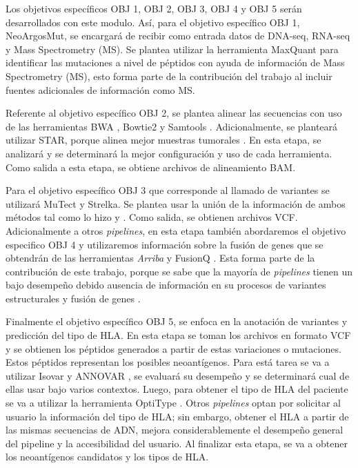 \documentclass[a4paper,11pt]{article}
\begin{document}
Los objetivos específicos OBJ 1, OBJ  2, OBJ 3, OBJ 4 y OBJ 5 serán desarrollados con este modulo. Así, para el objetivo específico OBJ 1, NeoArgosMut, se encargará de recibir como entrada datos de DNA-seq, RNA-seq y Mass Spectrometry (MS). Se plantea utilizar la herramienta MaxQuant \cite{prianichnikov2020maxquant} para identificar las mutaciones a nivel de péptidos con ayuda de información de Mass Spectrometry (MS), esto  forma parte de la contribución del trabajo al incluir fuentes adicionales de información como MS.


Referente al objetivo específico OBJ 2, se plantea alinear las secuencias con uso de las herramientas BWA \cite{li2009fast}, Bowtie2 \cite{langmead2019scaling} y Samtools \cite{danecek2021twelve}. Adicionalmente, se planteará utilizar STAR, porque alinea mejor muestras tumorales \cite{rubinsteyn2018computational}. En esta etapa, se analizará y se determinará la mejor configuración y uso de cada herramienta. Como salida a esta etapa, se obtiene archivos de alineamiento BAM.



Para el objetivo específico OBJ 3 que corresponde al llamado de variantes se utilizará MuTect y Strelka. Se plantea usar la unión de la información de ambos métodos tal como lo hizo \cite{zhou2023prioritizing} y \cite{rubinsteyn2018computational}. Como salida, se obtienen archivos VCF. Adicionalmente a otros \textit{pipelines}, en esta etapa también abordaremos el objetivo especifico OBJ 4 y utilizaremos información sobre la fusión de genes que se obtendrán de las herramientas \textit{Arriba} \cite{uhrig2021accurate} y FusionQ \cite{liu2013fusionq}. Esta forma parte de la contribución de este trabajo, porque se sabe que la mayoría de \textit{pipelines} tienen un bajo desempeño debido ausencia de información en su procesos de variantes estructurales y fusión de genes \cite{wood2020neoepiscope}. 



Finalmente el objetivo específico OBJ 5, se enfoca en la anotación de variantes y predicción del tipo de HLA. En esta etapa se toman los archivos en formato VCF y se obtienen los péptidos generados a partir de estas variaciones o mutaciones. Estos péptidos representan los posibles neoantígenos. Para está tarea se va a utilizar Isovar \cite{isovar2023} y ANNOVAR \cite{wang2010annovar}, se evaluará su desempeño y se determinará cual de ellas usar bajo varios contextos. Luego, para obtener el tipo de HLA del paciente se va a utilizar la herramienta OptiType \cite{szolek2014optitype}. Otros \textit{pipelines} optan por solicitar al usuario la información del tipo de HLA; sin embargo, obtener el HLA a partir de las mismas secuencias de ADN, mejora considerablemente el desempeño general del pipeline y la accesibilidad del usuario. Al  finalizar esta etapa, se va a obtener los neoantígenos candidatos y los tipos de HLA.
\end{document}
